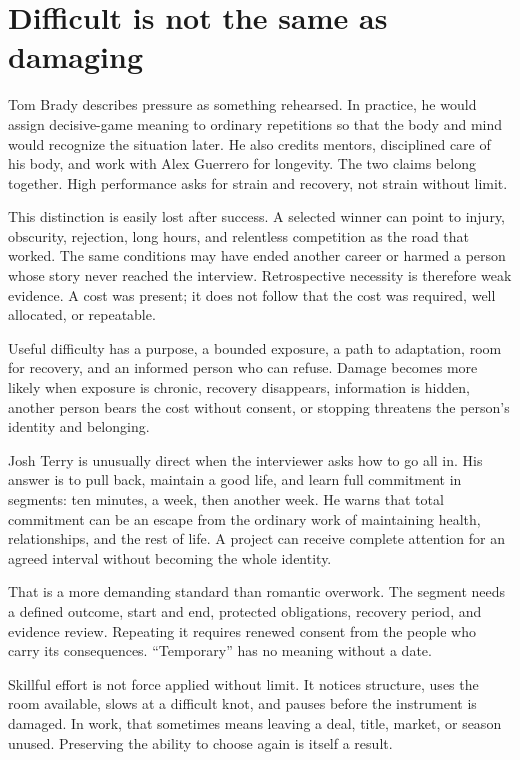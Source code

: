 \section{Difficult is not the same as damaging}

Tom Brady describes pressure as something rehearsed. In practice, he would
assign decisive-game meaning to ordinary repetitions so that the body and mind
would recognize the situation later. He also credits mentors, disciplined
care of his body, and work with Alex Guerrero for longevity. The two claims
belong together. High performance asks for strain and recovery, not strain
without limit.

This distinction is easily lost after success. A selected winner can point to
injury, obscurity, rejection, long hours, and relentless competition as the
road that worked. The same conditions may have ended another career or harmed
a person whose story never reached the interview. Retrospective necessity is
therefore weak evidence. A cost was present; it does not follow that the cost
was required, well allocated, or repeatable.

Useful difficulty has a purpose, a bounded exposure, a path to adaptation,
room for recovery, and an informed person who can refuse. Damage becomes more
likely when exposure is chronic, recovery disappears, information is hidden,
another person bears the cost without consent, or stopping threatens the
person's identity and belonging.

Josh Terry is unusually direct when the interviewer asks how to go all in. His
answer is to pull back, maintain a good life, and learn full commitment in
segments: ten minutes, a week, then another week. He warns that total
commitment can be an escape from the ordinary work of maintaining health,
relationships, and the rest of life. A project can receive complete attention
for an agreed interval without becoming the whole identity.

That is a more demanding standard than romantic overwork. The segment needs a
defined outcome, start and end, protected obligations, recovery period, and
evidence review. Repeating it requires renewed consent from the people who
carry its consequences. “Temporary” has no meaning without a date.

Skillful effort is not force applied without limit. It notices structure, uses
the room available, slows at a difficult knot, and pauses before the instrument
is damaged. In work, that sometimes means leaving a deal, title, market, or
season unused. Preserving the ability to choose again is itself a result.

